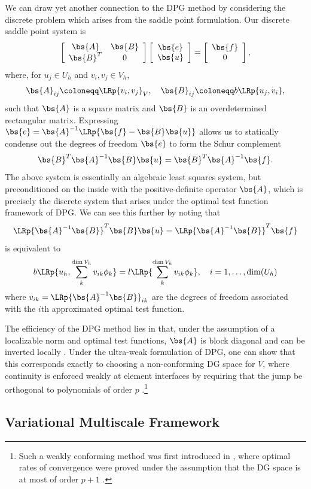 We can draw yet another connection to the DPG method by considering the discrete problem which arises from the saddle point formulation.  Our discrete saddle point system is
\[
\left[\begin{array}{cc} \bs{A} &\bs{B}\\ \bs{B}^T&{0}\end{array}\right]\left[\begin{array}{c}\bs{e}\\ \bs{u}\end{array}\right] = \left[\begin{array}{c}\bs{f}\\ 0\end{array}\right],
\]
where, for $u_j\in U_h$ and $v_i,v_j\in V_h$, 
\[
\bs{A}_{ij} \coloneqq \LRp{v_i,v_j}_V, \quad \bs{B}_{ij} \coloneqq b\LRp{u_j,v_i},
\]
such that $\bs{A}$ is a square matrix and $\bs{B}$ is an overdetermined rectangular matrix.  Expressing $\bs{e} = \bs{A}^{-1}\LRp{\bs{f}-\bs{B}\bs{u}}$ allows us to statically condense out the degrees of freedom $\bs{e}$ to form the Schur complement
\[
\bs{B}^T \bs{A}^{-1}\bs{B} \bs{u} = \bs{B}^T \bs{A}^{-1}\bs{f}.
\]
The above system is essentially an algebraic least squares system, but preconditioned on the inside with the positive-definite operator $\bs{A}$, which is precisely the discrete system that arises under the optimal test function framework of DPG.  We can see this further by noting that 
\[
\LRp{\bs{A}^{-1}\bs{B}}^T\bs{B} \bs{u} = \LRp{\bs{A}^{-1}\bs{B}}^T\bs{f} 
\]
is equivalent to 
\[
b\LRp{u_h, \sum_k^{\dim{V_h}} v_{ik}\phi_k} = l\LRp{\sum_k^{\dim{V_h}} v_{ik}\phi_k}, \quad i = 1,\ldots,\dim(U_h)
\]
where $v_{ik} = \LRp{\bs{A}^{-1}\bs{B}}_{ik}$ are the degrees of freedom associated with the $i$th approximated optimal test function.

The efficiency of the DPG method lies in that, under the assumption of a localizable norm and optimal test functions, $\bs{A}$ is block diagonal and can be inverted locally \cite{overviewDPG}.  Under the ultra-weak formulation of DPG, one can show that this corresponds exactly to choosing a non-conforming DG space for $V$, where continuity is enforced weakly at element interfaces by requiring that the jump be orthogonal to polynomials of order $p$ \cite{globalLocalDPG}.\footnote{Such a weakly conforming method was first introduced in \cite{brenner2008mathematical}, where optimal rates of convergence were proved under the assumption that the DG space is at most of order $p+1$ .}  

\subsection{Variational Multiscale Framework}

